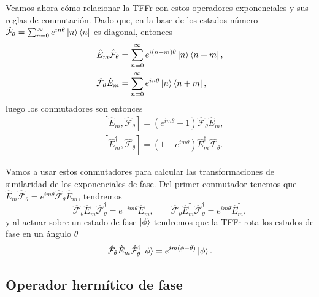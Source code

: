             Veamos ahora cómo relacionar la TFFr con estos operadores exponenciales y sus reglas de conmutación.  Dado que, en la base de los estados número $\hat{\mathcal{F}}_\theta = \sum_{n=0}^{\infty} e^{in\theta}\ket{n}\bra{n}$ es diagonal, entonces
            \begin{align*}
                & \hat{E}_m \hat{\mathcal{F}}_\theta = \sum_{n=0}^{\infty} e^{i(n+m)\theta}\ket{n}\bra{n+m},\\
                & \hat{\mathcal{F}}_\theta \hat{E}_m = \sum_{n=0}^{\infty} e^{in\theta}\ket{n}\bra{n+m},
            \end{align*}
            luego los conmutadores son entonces
            \begin{align}
                & \left[\hat{E}_m, \hat{\mathcal{F}}_\theta\right] = \left(e^{im\theta} - 1\right)\hat{\mathcal{F}}_\theta \hat{E}_m, \\
                & \left[\hat{E}_m^\dagger, \hat{\mathcal{F}}_\theta\right] = \left(1-e^{im\theta}\right)\hat{E}_m^\dagger \hat{\mathcal{F}}_\theta.
            \end{align}

            Vamos a usar estos conmutadores para calcular las transformaciones de similaridad de los exponenciales de fase. Del primer conmutador tenemos que $\hat{E}_m\hat{\mathcal{F}}_\theta = e^{im\theta} \hat{\mathcal{F}}_\theta \hat{E}_m$, tendremos
            \begin{equation}\label{eq:Cap3SimilaridadEm}
                \hat{\mathcal{F}}_\theta \hat{E}_m \hat{\mathcal{F}}_\theta^\dagger = e^{-im\theta} \hat{E}_m, \qquad \hat{\mathcal{F}}_\theta \hat{E}_m^\dagger \hat{\mathcal{F}}_\theta^\dagger = e^{im\theta} \hat{E}_m^\dagger,
            \end{equation}
            y al actuar sobre un estado de fase $\ket{\phi}$ tendremos que la TFFr rota los estados de fase en un ángulo $\theta$
            \begin{equation}
                \hat{\mathcal{F}}_\theta \hat{E}_m \hat{\mathcal{F}}_\theta^\dagger \ket{\phi} = e^{im(\phi-\theta)}\ket{\phi}.
            \end{equation}
        
        \subsection{Operador hermítico de fase}
            
